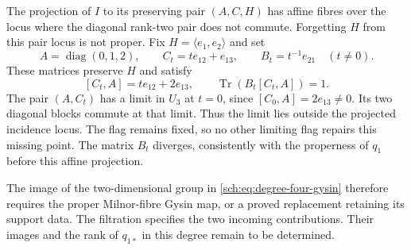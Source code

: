 The projection of $I$ to its preserving pair $(A,C,H)$ has affine
fibres over the locus where the diagonal rank-two pair does not
commute. Forgetting $H$ from this pair locus is not proper.
Fix $H=\langle e_1,e_2\rangle$ and set
\[
 A=\operatorname{diag}(0,1,2),\qquad
 C_t=t e_{12}+e_{13},\qquad B_t=t^{-1}e_{21}\quad(t\ne0).
\]
These matrices preserve $H$ and satisfy
\[
 [C_t,A]=t e_{12}+2e_{13},\qquad
 \operatorname{Tr}(B_t[C_t,A])=1.
\]
The pair $(A,C_t)$ has a limit in $U_3$ at $t=0$, since
$[C_0,A]=2e_{13}\ne0$. Its two diagonal blocks commute at that
limit. Thus the limit lies outside the projected incidence locus.
The flag remains fixed, so no other limiting flag repairs this
missing point. The matrix $B_t$ diverges, consistently with the
properness of $q_1$ before this affine projection.

The image of the two-dimensional group in
\eqref{sch:eq:degree-four-gysin} therefore requires the proper
Milnor-fibre Gysin map, or a proved replacement retaining its support
data. The filtration specifies the two incoming contributions.
Their images and the rank of $q_{1*}$ in this degree remain to be
determined.
